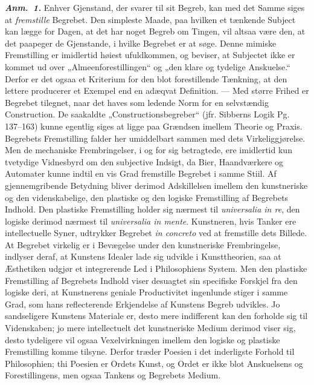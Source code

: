 \documentclass[12pt]{book}
\newcommand{\anm}[1]{\emph{\textbf{Anm.~#1.}}}
\newcommand{\opage}[1]{\marginnote{\footnotesize\textit{[#1]}}}
\begin{document}
\anm{1} Enhver Gjenstand, der svarer til sit Begreb, kan med det Samme siges at
\emph{fremstille} Begrebet. Den simpleste Maade, paa hvilken et tænkende Subject
kan lægge for Dagen, at det har noget Begreb om Tingen, vil altsaa være den, at
det paapeger de Gjenstande, i hvilke Begrebet er at søge. Denne mimiske
Fremstilling er imidlertid høiest ufuldkommen, og beviser, at Subjectet ikke er
kommet ud over „Almeenforestillingen“ og „den klare og tydelige Anskuelse.“
Derfor er det ogsaa et Kriterium for den blot forestillende Tænkning, at den
lettere producerer et Exempel end en adæqvat Definition. --- Med større Frihed er
Begrebet tilegnet, naar det haves som ledende Norm for en selvstændig
Construction. De saakaldte „Constructionsbegreber“ (jfr. Sibberns Logik
Pg. 137--163) kunne egentlig siges at ligge paa Grændsen imellem Theorie og
Praxis. Begrebets Fremstilling falder her umiddelbart sammen med dets
Virkeliggjørelse. Men de mechaniske Frembringelser, i og for sig betragtede, ere
imidlertid kun tvetydige Vidnesbyrd om den subjective Indsigt, da Bier,
Haandværkere og Automater kunne indtil en vis Grad fremstille Begrebet i samme
Stiil. Af gjennemgribende Betydning bliver derimod Adskillelsen imellem den
kunstneriske og den videnskabelige, den plastiske og den logiske Fremstilling af
Begrebets Indhold. Den plastiske Fremstilling holder sig nærmest til
\textit{universalia in re}, den logiske derimod nærmest til \textit{universalia
in mente}. Kunstneren, hvis Tanker ere intellectuelle Syner, udtrykker Begrebet
\textit{in concreto} ved at fremstille dets Billede. At Begrebet
\opage{37} virkelig er i Bevægelse under den kunstneriske Frembringelse, indlyser deraf, at
Kunstens Idealer lade sig udvikle i Kunsttheorien, saa at Æsthetiken udgjør et
integrerende Led i Philosophiens System. Men den plastiske Fremstilling af
Begrebets Indhold viser desuagtet sin specifiske Forskjel fra den logiske deri,
at Kunstnerens geniale Productivitet ingenlunde stiger i samme Grad, som hans
reflecterende Erkjendelse af Kunstens Begreb udvikles. Jo sandseligere Kunstens
Materiale er, desto mere indifferent kan den forholde sig til Videnskaben; jo
mere intellectuelt det kunstneriske Medium derimod viser sig, desto tydeligere
vil ogsaa Vexelvirkningen imellem den logiske og plastiske Fremstilling komme
tilsyne. Derfor træder Poesien i det inderligste Forhold til Philosophien; thi
Poesien er Ordets Kunst, og Ordet er ikke blot Anskuelsens og Forestillingens,
men ogsaa Tankens og Begrebets Medium.
\end{document}

